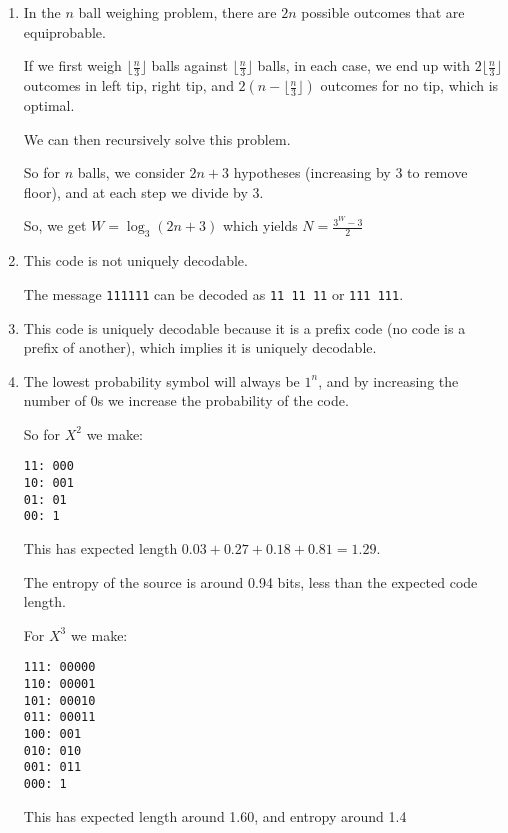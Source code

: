 \begin{enumerate}
                  \item
                    In the $n$ ball weighing problem, there are $2n$ possible outcomes that are equiprobable.

                    If we first weigh $\lfloor \frac{n}{3} \rfloor$ balls against $\lfloor \frac{n}{3} \rfloor$ balls, in each case, we end up with $2 \lfloor \frac{n}{3} \rfloor$ outcomes in left tip, right tip, and $2(n - \lfloor \frac{n}{3} \rfloor)$ outcomes for no tip, which is optimal.

                    We can then recursively solve this problem.

                    So for $n$ balls, we consider $2n+3$ hypotheses (increasing by 3 to remove floor), and at each step we divide by 3.

                    So, we get $W = \log_3 (2n+3)$ which yields $N = \frac{3^W - 3}{2}$

                    \item
                      This code is not uniquely decodable.

                      The message \texttt{111111} can be decoded as \texttt{11 11 11} or \texttt{111 111}.

                      \item
                        This code is uniquely decodable because it is a prefix code (no code is a prefix of another), which implies it is uniquely decodable.

    \item

      The lowest probability symbol will always be $1^n$, and by increasing the number of 0s we increase the probability of the code.

      So for $X^2$ we make:

\begin{verbatim}
11: 000
10: 001
01: 01
00: 1
\end{verbatim}

This has expected length $0.03 + 0.27 + 0.18 + 0.81 = 1.29$.

The entropy of the source is around 0.94 bits, less than the expected code length.

For $X^3$ we make:

\begin{verbatim}
111: 00000
110: 00001
101: 00010
011: 00011
100: 001
010: 010
001: 011
000: 1
\end{verbatim}

This has expected length around 1.60, and entropy around 1.4


\end{enumerate}
